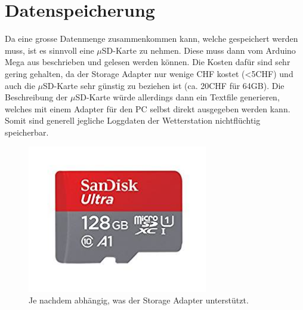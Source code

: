 \section{Datenspeicherung}
Da eine grosse Datenmenge zusammenkommen kann, welche gespeichert werden muss, ist es sinnvoll eine $\mu$SD-Karte zu nehmen. Diese muss dann vom Arduino Mega aus beschrieben und gelesen werden können. Die Kosten dafür sind sehr gering gehalten, da der Storage Adapter nur wenige CHF kostet (<5CHF) und auch die $\mu$SD-Karte sehr günstig zu beziehen ist (ca. 20CHF für 64GB). Die Beschreibung der $\mu$SD-Karte würde allerdings dann ein Textfile generieren, welches mit einem Adapter für den PC selbst direkt ausgegeben werden kann. Somit sind generell jegliche Loggdaten der Wetterstation nichtflüchtig speicherbar.
\begin{figure}[hbtp]
\centering
\includegraphics[width=0.7\textwidth]{graphics/msdcard.jpg}
\caption{Je nachdem abhängig, was der Storage Adapter unterstützt.}
\end{figure}
